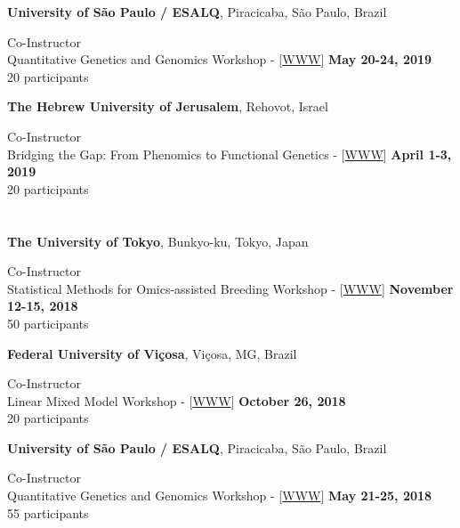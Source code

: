 \documentclass[margin,line,10pt]{res}
\begin{document}
\begin{resume}
{\bf University of S\~{a}o Paulo / ESALQ}, Piracicaba, S\~{a}o Paulo, Brazil
\vspace{.01pt}

Co-Instructor  \\
Quantitative Genetics and Genomics Workshop - [\textcolor{blue}{\href{http://morotalab.org/ESALQ2019/ESALQ2019.html}{WWW}}]
\hfill {\bf May 20-24, 2019} \\
20 participants


{\bf The Hebrew University of Jerusalem}, Rehovot, Israel
\vspace{.01pt}

Co-Instructor  \\
Bridging the Gap: From Phenomics to Functional Genetics - [\textcolor{blue}{\href{http://morotalab.org/HUJI2019/HUJI2019.html}{WWW}}]
\hfill {\bf April 1-3, 2019} \\
20 participants

\section{}

{\bf The University of Tokyo}, Bunkyo-ku, Tokyo, Japan
\vspace{.01pt}

Co-Instructor  \\
Statistical Methods for Omics-assisted Breeding Workshop - [\textcolor{blue}{\href{http://morotalab.org/UT2018/UT2018.html}{WWW}}]
\hfill {\bf November 12-15, 2018} \\
50 participants 



{\bf Federal University of Vi\c cosa}, Vi\c cosa, MG, Brazil
\vspace{.01pt}

Co-Instructor  \\
Linear Mixed Model Workshop - [\textcolor{blue}{\href{http://morotalab.org/UFV2018/UFV2018.html}{WWW}}]
\hfill {\bf October 26, 2018} \\
20 participants


{\bf University of S\~{a}o Paulo / ESALQ}, Piracicaba, S\~{a}o Paulo, Brazil
\vspace{.01pt}

Co-Instructor  \\
Quantitative Genetics and Genomics Workshop - [\textcolor{blue}{\href{http://morotalab.org/ESALQ2018/ESALQ2018.html}{WWW}}]
\hfill {\bf May 21-25, 2018} \\
55 participants



\end{resume}
\end{document}
